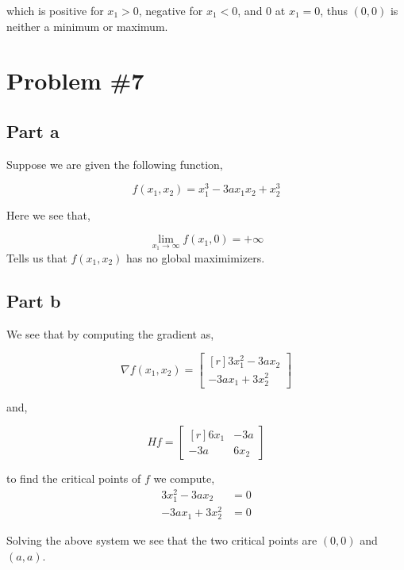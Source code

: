 \documentclass{article}
\begin{document}
which is positive for $x_1 > 0$, negative for $x_1 < 0$, and $0$ at $x_1 = 0$, thus $(0,0)$ is neither a minimum or maximum.


\section*{Problem \#7}

\subsection*{Part a}
Suppose we are given the following function,

\begin{equation*}
    f(x_1,x_2) = x_1^3 - 3ax_1x_2 + x_2^3
\end{equation*}

Here we see that,

\begin{equation*}
    \lim_{x_1 \to \infty}f(x_1,0) = +\infty
\end{equation*}
Tells us that $f(x_1,x_2)$ has no global maximimizers.
\subsection*{Part b}
We see that by computing the gradient as,

\begin{equation*}
    \nabla f(x_1,x_2) = \begin{bmatrix*}[r]
        3x_1^2-3ax_2 \\
        -3ax_1 + 3x_2^2
    \end{bmatrix*}
\end{equation*}

and,

\begin{equation*}
    Hf = \begin{bmatrix*}[r]
        6x_1 & -3a \\
        -3a & 6x_2
    \end{bmatrix*}
\end{equation*}

to find the critical points of $f$ we compute,
\begin{align*}
    3x_1^2-3ax_2 &= 0 \\
    -3ax_1 + 3x_2^2 &= 0
\end{align*}

Solving the above system we see that the two critical points are $(0,0)$ and $(a,a)$.
\end{document}
